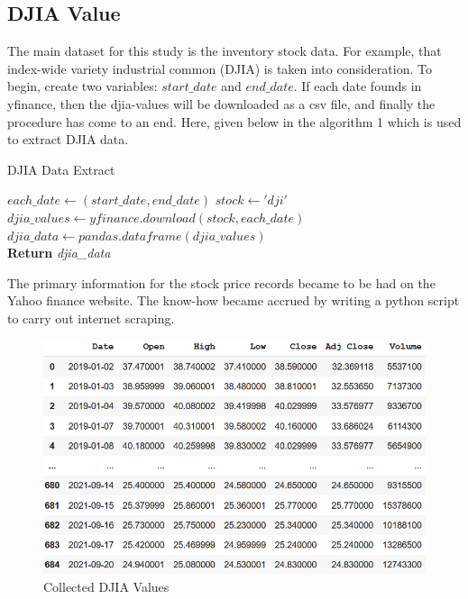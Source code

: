 \subsection{DJIA Value}

The main dataset for this study is the inventory stock data. For example, that index-wide variety industrial common (DJIA) is taken into consideration. 
To begin, create two variables: $start\_date$ and $end\_date$. If each date founds in yfinance, then the djia-values will be downloaded as a csv file, and finally the procedure has come to an end. Here, given below in the algorithm 1 which is used to extract DJIA data.\\

\begin{algorithm}
\caption{DJIA Data Extract}\label{alg:djia}
\begin{algorithmic}[1]
\State $each\_date \gets (start\_date, end\_date)$
\State $stock \gets 'dji'$
        \State $djia\_values \gets yfinance.download(stock,each\_date)$
    \EndIf
\EndFor
\State $djia\_data \gets pandas.dataframe(djia\_values)$
\\\textbf{Return}
\textit{djia\_data}
\end{algorithmic}
\end{algorithm}

The primary information for the stock price records became to be had on the Yahoo finance website. The know-how became accrued by writing a python script to carry out internet scraping.\\

\begin{figure}[H]
    \centering
    \includegraphics[scale=.8]{img3/Collected DJIA Values.png}
    \caption{Collected DJIA Values}
    \label{fig:DJIA Values}
\end{figure}


